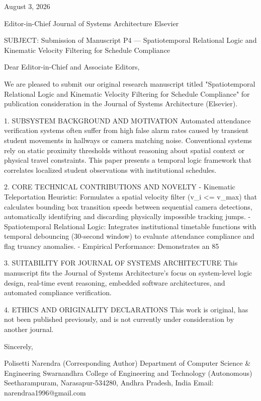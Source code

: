 August 3, 2026

Editor-in-Chief
Journal of Systems Architecture
Elsevier

SUBJECT: Submission of Manuscript P4 — Spatiotemporal Relational Logic and Kinematic Velocity Filtering for Schedule Compliance

Dear Editor-in-Chief and Associate Editors,

We are pleased to submit our original research manuscript titled "Spatiotemporal Relational Logic and Kinematic Velocity Filtering for Schedule Compliance" for publication consideration in the Journal of Systems Architecture (Elsevier).

1. SUBSYSTEM BACKGROUND AND MOTIVATION
Automated attendance verification systems often suffer from high false alarm rates caused by transient student movements in hallways or camera matching noise. Conventional systems rely on static proximity thresholds without reasoning about spatial context or physical travel constraints. This paper presents a temporal logic framework that correlates localized student observations with institutional schedules.

2. CORE TECHNICAL CONTRIBUTIONS AND NOVELTY
  - Kinematic Teleportation Heuristic: Formulates a spatial velocity filter (v_i <= v_max) that calculates bounding box transition speeds between sequential camera detections, automatically identifying and discarding physically impossible tracking jumps.
  - Spatiotemporal Relational Logic: Integrates institutional timetable functions with temporal debouncing (30-second window) to evaluate attendance compliance and flag truancy anomalies.
  - Empirical Performance: Demonstrates an 85%

3. SUITABILITY FOR JOURNAL OF SYSTEMS ARCHITECTURE
This manuscript fits the Journal of Systems Architecture's focus on system-level logic design, real-time event reasoning, embedded software architectures, and automated compliance verification.

4. ETHICS AND ORIGINALITY DECLARATIONS
This work is original, has not been published previously, and is not currently under consideration by another journal.

Sincerely,

Polisetti Narendra (Corresponding Author)
Department of Computer Science & Engineering
Swarnandhra College of Engineering and Technology (Autonomous)
Seetharampuram, Narasapur-534280, Andhra Pradesh, India
Email: narendraa1996@gmail.com
